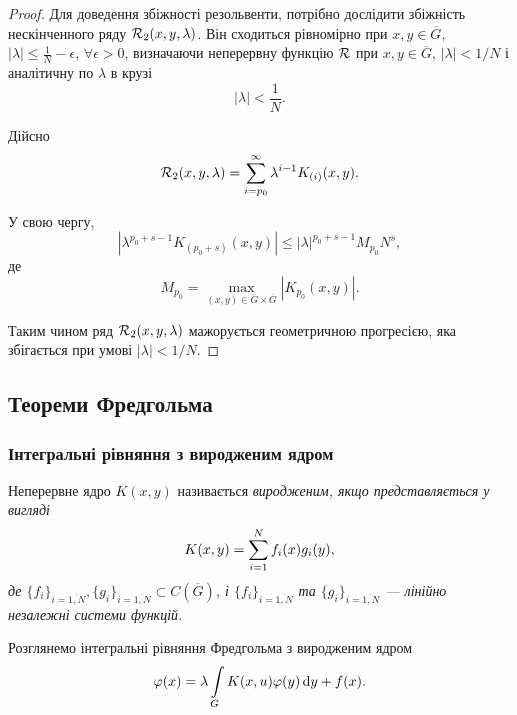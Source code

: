 \begin{proof}
	Для доведення збіжності резольвенти, потрібно дослідити збіжність нескінченного ряду $\cal{R}_2(x, y, \lambda)$. Він сходиться рівномірно при $x, y \in \overline G$, $|\lambda| \le \frac{1}{N} - \epsilon$, $\forall \epsilon > 0$, визначаючи неперервну функцію $\cal{R}$ при $x, y \in \overline G$, $|\lambda| < 1 / N$ і аналітичну по $\lambda$ в крузі 
	\begin{equation}
		|\lambda| < \dfrac{1}{N}.
	\end{equation}

	Дійсно
	\begin{equation}
		\cal{R}_2(x, y, \lambda) = \Sum_{i = p_0}^\infty \lambda^{i - 1} K_{(i)}(x, y).
	\end{equation}

	У свою чергу, 
	\begin{equation}
		|\lambda^{p_0 + s - 1} K_{(p_0 + s)}(x, y)| \le |\lambda|^{p_0 + s - 1} M_{p_0} N^s,
	\end{equation}
	де
	\begin{equation}
		M_{p_0} = \max_{(x, y) \in \overline G \times \overline G} |K_{p_0}(x, y)|.
	\end{equation}

	Таким чином ряд $\cal{R}_2(x, y, \lambda)$ мажорується геометричною прогресією, яка збігається при умові $|\lambda| < 1 / N$.
\end{proof}

\subsection{Теореми Фредгольма}

\subsubsection{Інтегральні рівняння з виродженим ядром}

\begin{definition}
	Неперервне ядро $K(x, y)$ називається \it{виродженим}, якщо представляється у вигляді
	\begin{equation}
		K(x, y) = \Sum_{i = 1}^N f_i(x) g_i(y),
	\end{equation}
	де $\{ f_i \}_{i = \overline{1, N}}, \{ g_i \}_{i = \overline{1, N}} \subset C\left(\overline G\right)$, і $\{ f_i \}_{i = \overline{1, N}}$ та $\{ g_i \}_{i = \overline{1, N}}$ --- лінійно незалежні системи функцій.
\end{definition}

\begin{definition}
	Розглянемо інтегральні рівняння Фредгольма з виродженим ядром 
	\begin{equation}
		\phi(x) = \lambda \Int_G K(x, u) \phi(y) \diff y + f(x).
	\end{equation}
\end{definition}

